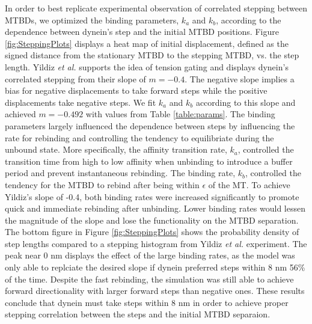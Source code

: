 \documentclass[9pt,twocolumn,twoside]{article}
\begin{document}

In order to best replicate experimental observation of correlated stepping between MTBDs, we optimized the binding parameters, $k_a$ and $k_b$, according to the dependence between dynein's step and the initial MTBD positions. Figure \ref{fig:SteppingPlots} displays a heat map of initial displacement, defined as the signed distance from the stationary MTBD to the stepping MTBD, vs. the step length. Yildiz \textit{et al.} supports the idea of tension gating and displays dynein's correlated stepping from their slope of $m = -0.4$. The negative slope implies a bias for negative displacements to take forward steps while the positive displacements take negative steps. We fit $k_a$ and $k_b$ according to this slope and achieved $m = -0.492$ with values from Table \ref{table:params}. The binding parameters largely influenced the dependence between steps by influencing the rate for rebinding and controlling the tendency to equilibriate during the unbound state. More specifically, the affinity transition rate, $k_a$, controlled the transition time from high to low affinity when unbinding to introduce a buffer period and prevent instantaneous rebinding. The binding rate, $k_b$, controlled the tendency for the MTBD to rebind after being within $\epsilon$ of the MT. To achieve Yildiz's slope of -0.4, both binding rates were increased significantly to promote quick and immediate rebinding after unbinding. Lower binding rates would lessen the magnitude of the slope and lose the functionality on the MTBD separation. The bottom figure in Figure \ref{fig:SteppingPlots} shows the probability density of step lengths compared to a stepping histogram from Yildiz \textit{et al.} experiment. The peak near 0 nm displays the effect of the large binding rates, as the model was only able to replciate the desired slope if dynein preferred steps within 8 nm 56\% of the time. Despite the fast rebinding, the simulation was still able to achieve forward directionality with larger forward steps than negative ones. These results conclude that dynein must take steps within 8 nm in order to achieve proper stepping correlation between the steps and the initial MTBD separaion.
\end{document}
